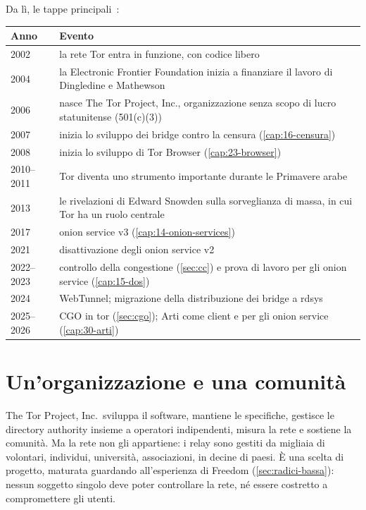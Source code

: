 Da lì, le tappe principali~\cite{torhistory}:
\begin{center}\small
\begin{tabularx}{\textwidth}{@{}l>{\raggedright\arraybackslash}X@{}}
\toprule
Anno & Evento \\
\midrule
2002 & la rete Tor entra in funzione, con codice libero \\
2004 & la Electronic Frontier Foundation inizia a finanziare il lavoro di Dingledine e Mathewson \\
2006 & nasce The Tor Project, Inc., organizzazione senza scopo di lucro statunitense (501(c)(3)) \\
2007 & inizia lo sviluppo dei bridge contro la censura (\cref{cap:16-censura}) \\
2008 & inizia lo sviluppo di Tor Browser (\cref{cap:23-browser}) \\
2010--2011 & Tor diventa uno strumento importante durante le Primavere arabe \\
2013 & le rivelazioni di Edward Snowden sulla sorveglianza di massa, in cui Tor ha un ruolo centrale \\
2017 & onion service v3 (\cref{cap:14-onion-services}) \\
2021 & disattivazione degli onion service v2 \\
2022--2023 & controllo della congestione (\cref{sec:cc}) e prova di lavoro per gli onion service (\cref{cap:15-dos}) \\
2024 & WebTunnel; migrazione della distribuzione dei bridge a rdsys \\
2025--2026 & CGO in tor (\cref{sec:cgo}); Arti come client e per gli onion service (\cref{cap:30-arti}) \\
\bottomrule
\end{tabularx}
\end{center}

\section{Un'organizzazione e una comunità}\label{sec:nascita-comunita}

The Tor Project, Inc.\ sviluppa il software, mantiene le specifiche, gestisce le directory authority insieme a operatori indipendenti, misura la rete e sostiene la comunità. Ma la rete non gli appartiene: i relay sono gestiti da migliaia di volontari, individui, università, associazioni, in decine di paesi. È una scelta di progetto, maturata guardando all'esperienza di Freedom (\cref{sec:radici-bassa}): nessun soggetto singolo deve poter controllare la rete, né essere costretto a compromettere gli utenti.

